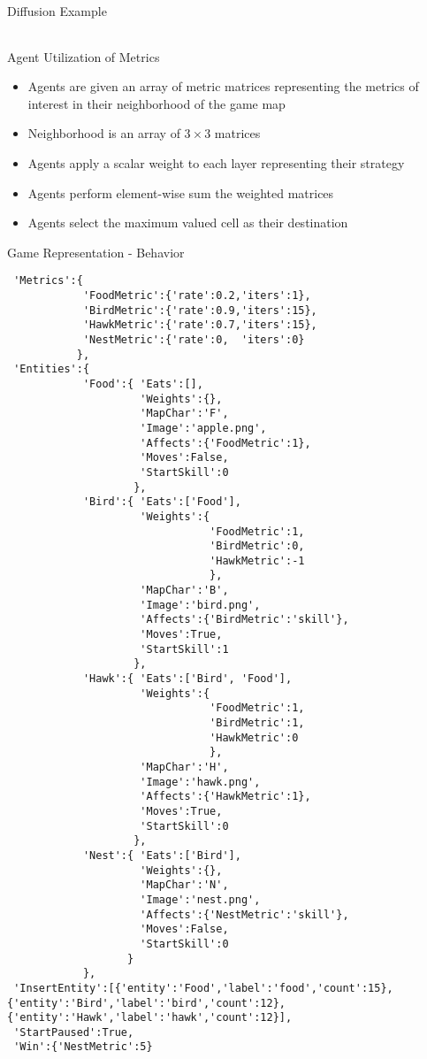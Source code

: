 \documentclass{beamer}
\begin{document}
\begin{frame}{Diffusion Example}
\begin{tabular}{lllL}
  \end{tabular}




\end{frame}



\begin{frame}{Agent Utilization of Metrics}
  \begin{itemize}
   \item Agents are given an array of metric matrices representing the metrics of interest in their neighborhood of the game map
   \item Neighborhood is an array of $3 \times 3$ matrices
   \item Agents apply a scalar weight to each layer representing their strategy
   \item Agents perform element-wise sum the weighted matrices
   \item Agents select the maximum valued cell as their destination
   
  \end{itemize}

  
\end{frame}

\begin{frame}[fragile]{Game Representation - Behavior}\fontsize{4pt}{4}\selectfont
\begin{verbatim}
 'Metrics':{
 			'FoodMetric':{'rate':0.2,'iters':1},
		    'BirdMetric':{'rate':0.9,'iters':15},
		    'HawkMetric':{'rate':0.7,'iters':15},
		    'NestMetric':{'rate':0,  'iters':0}
		   },
 'Entities':{
			'Food':{ 'Eats':[],
					 'Weights':{},
					 'MapChar':'F',
					 'Image':'apple.png',
					 'Affects':{'FoodMetric':1},
					 'Moves':False,
					 'StartSkill':0
					},
			'Bird':{ 'Eats':['Food'],
					 'Weights':{
					 			'FoodMetric':1,
			   					'BirdMetric':0,
			   					'HawkMetric':-1
			   					},
					 'MapChar':'B',
					 'Image':'bird.png',
					 'Affects':{'BirdMetric':'skill'},
					 'Moves':True,
					 'StartSkill':1
					},
			'Hawk':{ 'Eats':['Bird', 'Food'],
					 'Weights':{
					 			'FoodMetric':1,
			   					'BirdMetric':1,
			   					'HawkMetric':0
			   					},
					 'MapChar':'H',
					 'Image':'hawk.png',
					 'Affects':{'HawkMetric':1},
					 'Moves':True,
					 'StartSkill':0
					},
			'Nest':{ 'Eats':['Bird'],
					 'Weights':{},
					 'MapChar':'N',
					 'Image':'nest.png',
					 'Affects':{'NestMetric':'skill'},
					 'Moves':False,
					 'StartSkill':0
				   }
			},
 'InsertEntity':[{'entity':'Food','label':'food','count':15},{'entity':'Bird','label':'bird','count':12}, {'entity':'Hawk','label':'hawk','count':12}],
 'StartPaused':True,
 'Win':{'NestMetric':5}
  \end{verbatim}

\end{frame}
\end{document}
